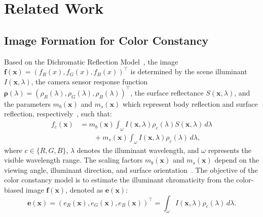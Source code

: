 \section{Related Work}
\label{sec2}
\subsection{Image Formation for Color Constancy} \label{sec2.1}
\par Based on the Dichromatic Reflection Model~\cite{klinker1990physical}, the image $\boldsymbol{f}(\boldsymbol{x}) = \left( f_R(x), f_G(x), f_B(x) \right)^\top$ is determined by the scene illuminant $I(\boldsymbol{x}, \lambda)$, the camera sensor response function $\boldsymbol{\rho}(\lambda) = \left( \rho_R(\lambda), \rho_G(\lambda), \rho_B(\lambda) \right)^\top$, the surface reflectance $S(\boldsymbol{x}, \lambda)$, and the parameters $m_b(\boldsymbol{x})$ and $m_s(\boldsymbol{x})$ which represent body reflection and surface reflection, respectively~\cite{gijsenij2011computational}, such that:
\begin{equation} \label{eq1}
\begin{aligned}
  f_c(\boldsymbol{x}) &= m_b(\boldsymbol{x}) \int_\omega I(\boldsymbol{x}, \lambda) \rho_c(\lambda) S(\boldsymbol{x}, \lambda) \, d\lambda \\
  &\quad\quad + m_s(\boldsymbol{x}) \int_\omega I(\boldsymbol{x}, \lambda) \rho_c(\lambda) \, d\lambda,
\end{aligned}
\end{equation}
where $c \in \{R, G, B\}$, $\lambda$ denotes the illuminant wavelength, and $\omega$ represents the visible wavelength range. The scaling factors $m_b(\boldsymbol{x})$ and $m_s(\boldsymbol{x})$ depend on the viewing angle, illuminant direction, and surface orientation~\cite{van2006coloring}. 
The objective of the color constancy model is to estimate the illuminant chromaticity from the color-biased image $\boldsymbol{f}(\boldsymbol{x})$, denoted as $\boldsymbol{e}(\boldsymbol{x})$:
\begin{equation} \label{eq2}
\boldsymbol{e}(\boldsymbol{x}) = \left(e_R(\boldsymbol{x}), e_G(\boldsymbol{x}), e_B(\boldsymbol{x})\right)^\top = \int_\omega I(\boldsymbol{x}, \lambda) \rho_c(\lambda) \, d\lambda.
\end{equation}


